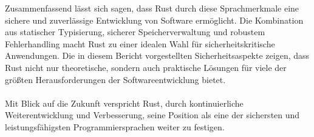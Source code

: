 \noindent
Zusammenfassend lässt sich sagen, dass Rust durch diese Sprachmerkmale eine sichere und zuverlässige Entwicklung von Software ermöglicht. 
Die Kombination aus statischer Typisierung, sicherer Speicherverwaltung und robustem Fehlerhandling macht Rust zu einer idealen Wahl für sicherheitskritische Anwendungen. 
Die in diesem Bericht vorgestellten Sicherheitsaspekte zeigen, dass Rust nicht nur theoretische, sondern auch praktische Lösungen für viele der größten Herausforderungen der Softwareentwicklung bietet.\\
\\
Mit Blick auf die Zukunft verspricht Rust, durch kontinuierliche Weiterentwicklung und Verbesserung, seine Position als eine der sichersten und leistungsfähigsten Programmiersprachen weiter zu festigen.

